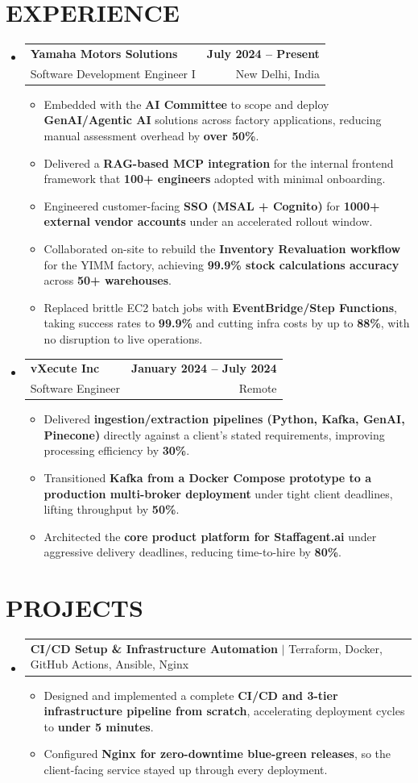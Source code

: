 \documentclass[letterpaper,10pt]{article}
\makeatletter
\renewcommand{\normalsize}{%
  \fontsize{10.1}{12.25}\selectfont
}
\newcommand{\resumeItem}[1]{
  \item\normalsize{
    {#1}
  }
}
\newcommand{\resumeSubheading}[4]{
  \item
    \begin{tabular*}{1.0\textwidth}[t]{l@{\extracolsep{\fill}}r}
      \textbf{\normalsize#1} & \textbf{\normalsize#2} \\
      {\normalsize#3} & {\normalsize#4} \\
    \end{tabular*}\vspace{1pt}
}
\newcommand{\resumeProjectHeading}[2]{
  \item
    \begin{tabular*}{1.0\textwidth}{l@{\extracolsep{\fill}}r}
      \normalsize#1 & \textbf{\normalsize#2}\\
    \end{tabular*}\vspace{2pt}
}
\newcommand{\resumeSubHeadingListStart}{\begin{itemize}[leftmargin=0.0in, label={}, itemsep=6pt, topsep=2pt]}
\newcommand{\resumeSubHeadingListEnd}{\end{itemize}}
\newcommand{\resumeItemListStart}{\begin{itemize}}
\newcommand{\resumeItemListEnd}{\end{itemize}\vspace{-3pt}}
\makeatother
\begin{document}
\section{EXPERIENCE}
  \resumeSubHeadingListStart

    \resumeSubheading
      {Yamaha Motors Solutions}{July 2024 -- Present}
      {Software Development Engineer I}{New Delhi, India}
      \resumeItemListStart
        \resumeItem{Embedded with the \textbf{AI Committee} to scope and deploy \textbf{GenAI/Agentic AI} solutions across factory applications, reducing manual assessment overhead by \textbf{over 50\%}.}
        \resumeItem{Delivered a \textbf{RAG-based MCP integration} for the internal frontend framework that \textbf{100+ engineers} adopted with minimal onboarding.}
        \resumeItem{Engineered customer-facing \textbf{SSO (MSAL + Cognito)} for \textbf{1000+ external vendor accounts} under an accelerated rollout window.}
        \resumeItem{Collaborated on-site to rebuild the \textbf{Inventory Revaluation workflow} for the YIMM factory, achieving \textbf{99.9\% stock calculations accuracy} across \textbf{50+ warehouses}.}
        \resumeItem{Replaced brittle EC2 batch jobs with \textbf{EventBridge/Step Functions}, taking success rates to \textbf{99.9\%} and cutting infra costs by up to \textbf{88\%}, with no disruption to live operations.}
      \resumeItemListEnd

    \resumeSubheading
      {vXecute Inc}{January 2024 -- July 2024}
      {Software Engineer}{Remote}
      \resumeItemListStart
        \resumeItem{Delivered \textbf{ingestion/extraction pipelines (Python, Kafka, GenAI, Pinecone)} directly against a client's stated requirements, improving processing efficiency by \textbf{30\%}.}
        \resumeItem{Transitioned \textbf{Kafka from a Docker Compose prototype to a production multi-broker deployment} under tight client deadlines, lifting throughput by \textbf{50\%}.}
        \resumeItem{Architected the \textbf{core product platform for Staffagent.ai} under aggressive delivery deadlines, reducing time-to-hire by \textbf{80\%}.}
      \resumeItemListEnd

  \resumeSubHeadingListEnd

\section{PROJECTS}
  \resumeSubHeadingListStart
    \resumeProjectHeading
      {\textbf{CI/CD Setup \& Infrastructure Automation} $|$ \textnormal{Terraform, Docker, GitHub Actions, Ansible, Nginx}}{}
      \resumeItemListStart
        \resumeItem{Designed and implemented a complete \textbf{CI/CD and 3-tier infrastructure pipeline from scratch}, accelerating deployment cycles to \textbf{under 5 minutes}.}
        \resumeItem{Configured \textbf{Nginx for zero-downtime blue-green releases}, so the client-facing service stayed up through every deployment.}
      \resumeItemListEnd
  \resumeSubHeadingListEnd
\end{document}
